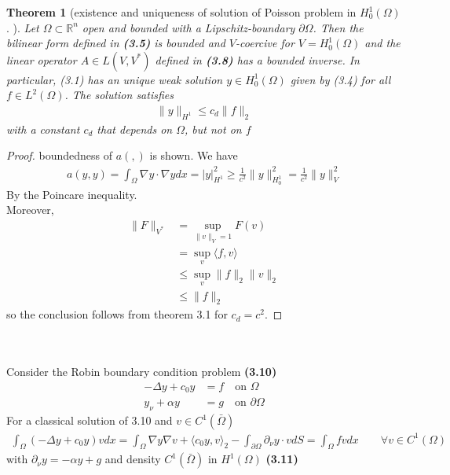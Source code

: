 \documentclass[a4paper,11pt,fleqn]{book}
\newtheorem{theorem}{Theorem}[section]
\theoremstyle{definition}
\theoremstyle{remark}
\begin{document}
\begin{theorem}[existence and uniqueness of solution of Poisson problem in $H^1_0(\Omega)$. ]
	Let $\Omega \subset \mathbb{R}^n$ open and bounded with a Lipschitz-boundary $\partial \Omega$. Then the bilinear form defined in \textbf{(3.5)} is bounded and $V$-coercive for $V = H_0^1(\Omega)$ and the linear operator $A \in L(V, V^*)$ defined in \textbf{(3.8)} has a bounded inverse. In particular, (3.1) has an unique weak solution $y \in H_0^1(\Omega)$ given by (3.4) for all $f \in L^2(\Omega)$. The solution satisfies
	\begin{align*}
		\|y\|_{H^1} \le c_d \|f\|_2
	\end{align*}
	with a constant $c_d$ that depends on $\Omega$, but not on $f$
\end{theorem}
\begin{proof}
	boundedness of $a(,)$ is shown. We have
	\begin{align*}
		a(y, y) = \int_\Omega \nabla y \cdot \nabla y dx = |y|^2_{H^1} 
		\geq \frac{1}{c^2} \|y\|_{H_0^1}^2 = \frac{1}{c^2}\|y\|^2_V
	\end{align*}
	By the Poincare inequality. \\
	Moreover, 
	\begin{align*}
		\|F\|_{V^*} &= \sup_{\|v\|_V = 1} F(v) \\
		&= \sup_v \langle f, v \rangle \\
		&\le \sup_v \|f\|_2 \|v\|_2 \\
		&\le \|f\|_2
	\end{align*}
	so the conclusion follows from theorem 3.1 for $c_d = c^2$. 
\end{proof}
\quad\\
\quad\\
Consider the Robin boundary condition problem \textbf{(3.10)}
\begin{align*}
	-\Delta y + c_0 y &= f \quad \text{on } \Omega \\
	y_\nu + \alpha y &= g \quad \text{on } \partial \Omega
\end{align*}
For a classical solution of 3.10 and $v \in C^1(\bar{\Omega})$ 
\begin{align*}
	\int_\Omega (-\Delta y + c_0 y )v dx = \int_\Omega \nabla y \nabla v + 
	\langle c_0 y , v \rangle_2 - \int_{\partial \Omega} \partial_\nu y \cdot  v  dS = \int_\Omega fv dx \qquad \forall v \in C^1(\Omega)
\end{align*}
with $\partial_\nu y = - \alpha y + g$ and density $C^1(\bar{\Omega})$ in $H^1(\Omega)$  \textbf{(3.11)}
\end{document}
